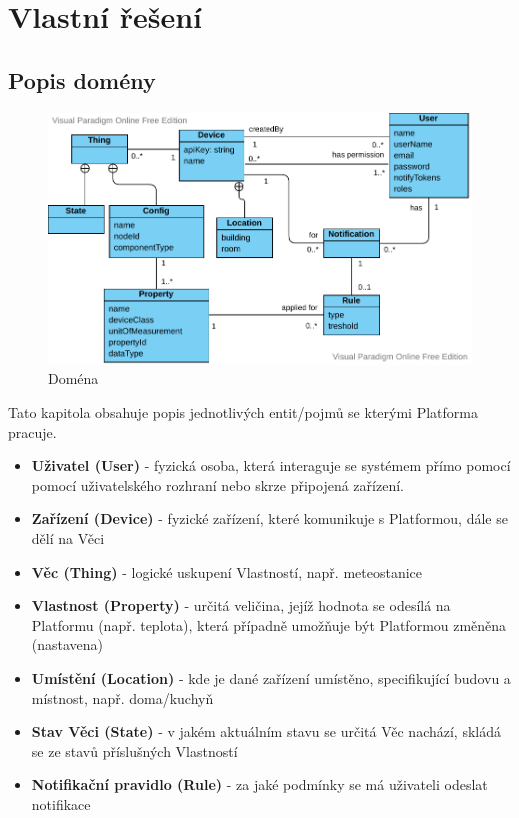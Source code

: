 \section{Vlastní řešení}

\subsection{Popis domény} %
\begin{figure}[htbp]
    \centering
    \includegraphics[width=\textwidth]{img/domain.pdf}
    \caption{Doména}
\end{figure}
Tato kapitola obsahuje popis jednotlivých entit/pojmů se kterými Platforma pracuje.
\begin{itemize}
    \item \textbf{Uživatel (User)} - fyzická osoba, která interaguje se systémem přímo pomocí pomocí uživatelského rozhraní nebo skrze připojená zařízení.
    \item \textbf{Zařízení (Device)} - fyzické zařízení, které komunikuje s Platformou, dále se dělí na Věci
    \item \textbf{Věc (Thing)} - logické uskupení Vlastností, např. meteostanice
    \item \textbf{Vlastnost (Property)} - určitá veličina, jejíž hodnota se odesílá na Platformu (např. teplota), která případně umožňuje být Platformou změněna (nastavena)
    \item \textbf{Umístění (Location)} - kde je dané zařízení umístěno, specifikující budovu a místnost, např. doma/kuchyň
    \item \textbf{Stav Věci (State)} - v jakém aktuálním stavu se určitá Věc nachází, skládá se ze stavů příslušných Vlastností
    \item \textbf{Notifikační pravidlo (Rule)} - za jaké podmínky se má uživateli odeslat notifikace
\end{itemize}


